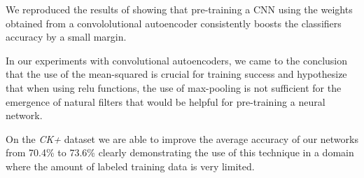 \documentclass{article}
\begin{document}
  We reproduced the results of \citep{masci11} showing that pre-training a CNN using the weights obtained from a convololutional autoencoder consistently boosts the classifiers accuracy by a small margin. 

  In our experiments with convolutional autoencoders, we came to the conclusion that the use of the mean-squared is crucial for training success and hypothesize that when using relu functions, the use of max-pooling is not sufficient for the emergence of natural filters that would be helpful for pre-training a neural network. 

  On the \emph{CK+} dataset we are able to improve the average accuracy of our networks from 70.4\% to 73.6\% clearly demonstrating the use of this technique in a domain where the amount of labeled training data is very limited. 



\clearpage

\end{document}
